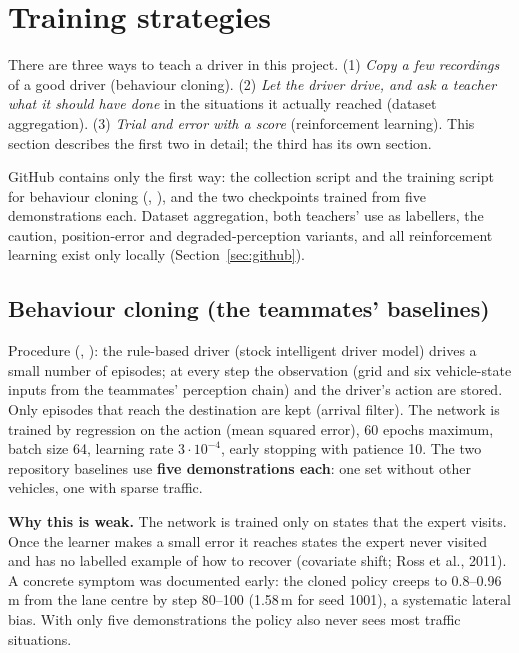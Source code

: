 \section{Training strategies}\label{sec:training}

\begin{plainwords}
There are three ways to teach a driver in this project. (1) \emph{Copy a few recordings} of a good driver (behaviour cloning). (2) \emph{Let the driver drive, and ask a teacher what it should have done} in the situations it actually reached (dataset aggregation). (3) \emph{Trial and error with a score} (reinforcement learning). This section describes the first two in detail; the third has its own section.
\end{plainwords}
\begin{cautionbox}
GitHub contains only the first way: the collection script and the training script for behaviour cloning (, ), and the two checkpoints trained from five demonstrations each. Dataset aggregation, both teachers' use as labellers, the caution, position-error and degraded-perception variants, and all reinforcement learning exist only locally (Section~\ref{sec:github}).
\end{cautionbox}


\subsection{Behaviour cloning (the teammates' baselines)}
Procedure (, ): the rule-based driver (stock intelligent driver model) drives a small number of episodes; at every step the observation (grid and six vehicle-state inputs from the teammates' perception chain) and the driver's action are stored.
Only episodes that reach the destination are kept (arrival filter). The network is trained by regression on the action (mean squared error), 60 epochs maximum, batch size 64, learning rate $3\cdot10^{-4}$, early stopping with patience 10.
The two repository baselines use \textbf{five demonstrations each}: one set without other vehicles, one with sparse traffic.

\textbf{Why this is weak.} The network is trained only on states that the expert visits. Once the learner makes a small error it reaches states the expert never visited and has no labelled example of how to recover (covariate shift; Ross et al., 2011).
A concrete symptom was documented early: the cloned policy creeps to 0.8--0.96\,m from the lane centre by step 80--100 (1.58\,m for seed 1001), a systematic lateral bias. With only five demonstrations the policy also never sees most traffic situations.

